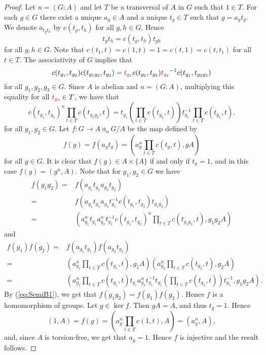\begin{proof}
Let $n=(G:A)$ and let $T$ be a transversal of $A$ in $G$ such that $1\in T$. For each $g\in G$ there exist a unique $a_g\in A$ and a unique $t_g\in T$ such that $g=a_gt_g$. We denote $a_{t_gt_h}$ by $c(t_g,t_h)$ for all $g,h\in G$. Hence
\[ t_gt_h=c(t_g,t_h)t_{gh}\]
for all $g,h\in G$. Note that $c(t_1,t)=c(1,t)=1=c(t,1)=c(t,t_1)$ for all $t\in T$. The associativity of $G$ implies that
\[c(t_{g_1},t_{g_2})c(t_{g_1g_2},t_{g_3})=\textcolor{red}{t_{g_1}}c(t_{g_2},t_{g_3})\textcolor{red}{t_{g_1}}^{-1}c(t_{g_1},t_{g_2g_3})\]
for all $g_1,g_2,g_3\in G$. Since $A$ is abelian and $n=(G:A)$, multiplying this equality for all $\textcolor{red}{t_{g_3}}\in T$, we have that
\begin{equation}\label{eq:SemiB1}
c(t_{g_1},t_{g_2})^n\prod_{t\in T}c(t_{g_1g_2},t)=t_{g_1}\left(\prod_{t\in T}c(t_{g_2},t)\right)t_{g_1}^{-1}\prod_{t\in T}c(t_{g_1},t).
\end{equation}
for all $g_1,g_2\in G$. Let $f\colon G\to A\rtimes_{\alpha} G/A$ be the map defined by
\[ f(g)=f(a_gt_g)=\left( a_g^n\prod_{t\in T}c(t_g,t), gA\right)\]
for all $g\in G$. It is clear that $f(g)\in A\times\{ A\}$ if and only if $t_g=1$, and in this case $f(g)=(g^n,A)$. Note that for $g_1,g_2\in G$ we have
\begin{align*}
    f(g_1g_2)=&f(a_{g_1}t_{g_1}a_{g_2}t_{g_2})\\
    =&f(a_{g_1}t_{g_1}a_{g_2}t_{g_1}^{-1}c(t_{g_1},t_{g_2})t_{g_1g_2})\\
    =&\left(a_{g_1}^nt_{g_1}a_{g_2}^nt_{g_1}^{-1}c(t_{g_1},t_{g_2})^n\prod_{t\in T}c(t_{g_1g_2},t),g_1g_2A\right)
\end{align*}
and
\begin{align*}
    f(g_1)f(g_2)=&f(a_{g_1}t_{g_1})f(a_{g_2}t_{g_2})\\
    =&\left(a_{g_1}^n\prod_{t\in T}c(t_{g_1},t),g_1A\right)\left(a_{g_2}^n\prod_{t\in T}c(t_{g_2},t),g_2A\right)\\
    =&\left(a_{g_1}^n\prod_{t\in T}c(t_{g_1},t)t_{g_1}a_{g_2}^nt_{g_1}^{-1}t_{g_1}\left(\prod_{t\in T}c(t_{g_2},t)\right)t_{g_1}^{-1},g_1g_2A\right).
\end{align*}
By (\ref{eq:SemiB1}), we get that $f(g_1g_2)=f(g_1)f(g_2)$. Hence $f$ is a homomorphism of groups. Let $g\in \ker f$. Then $gA=A$, and thus $t_g=1$. Hence
\[ (1,A)=f(g)=\left( a_g^n\prod_{t\in T}c(1,t), A\right)=(a_{g}^n,A),\]
and, since $A$ is torsion-free, we get that $a_g=1$. Hence $f$ is injective and the result follows.
\end{proof}


